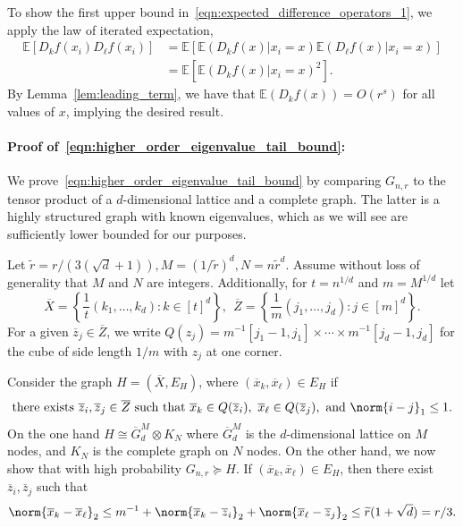 \documentclass{article}
\newcommand{\set}[1]{\left\{#1\right\}}
\newcommand{\1}{\mathbf{1}}
\newcommand{\Ebb}{\mathbb{E}}
\newcommand{\wt}[1]{\widetilde{#1}}
\newcommand{\ol}[1]{\overline{#1}}
\theoremstyle{alden}
\theoremstyle{aldenthm}
\theoremstyle{definition}
\theoremstyle{remark}
\begin{document}
To show the first upper bound in~\eqref{eqn:expected_difference_operators_1}, we apply the law of iterated expectation, 
\begin{align}
\Ebb\left[D_kf(x_i)D_{\ell}f(x_i)\right] & = \Ebb\left[\Ebb\left(D_kf(x)|x_i = x\right) \Ebb\left(D_{\ell}f(x)|x_i = x\right)\right] \nonumber \\
& = \Ebb\left[\Ebb\left(D_kf(x)|x_i = x\right)^2\right]. \label{eqn:expected_difference_operators_pf1}
\end{align}
By Lemma~\ref{lem:leading_term}, we have that $\Ebb(D_kf(x)) = O(r^s)$ for all values of $x$, implying the desired result.

\paragraph{Proof of~\eqref{eqn:higher_order_eigenvalue_tail_bound}:}

We prove~\eqref{eqn:higher_order_eigenvalue_tail_bound} by comparing $G_{n,r}$ to the tensor product of a $d$-dimensional lattice and a complete graph. The latter is a highly structured graph with known eigenvalues, which as we will see are sufficiently lower bounded for our purposes.

Let $\wt{r} = r/(3(\sqrt{d} + 1)), M = (1/\wt{r})^d, N = n\wt{r}^d$. Assume without loss of generality that $M$ and $N$ are integers. Additionally, for $t = n^{1/d}$ and $m = M^{1/d}$ let 
\begin{equation*}
\overline{X} = \set{\frac{1}{t}(k_1,\ldots,k_d): k \in [t]^d},~~ \overline{Z} = \set{\frac{1}{m}(j_1,\ldots,j_d): j \in [m]^d}.
\end{equation*}
For a given $\overline{z}_j \in \overline{Z}$, we write $Q(z_j) = m^{-1}[j_1 - 1,j_1] \times \cdots \times m^{-1}[j_d - 1,j_d]$ for the cube of side length $1/m$ with $z_j$ at one corner. 

Consider the graph $H = (\overline{X}, E_H)$, where $(\ol{x}_k, \ol{x}_{\ell}) \in E_H$ if
\begin{equation*}
\textrm{there exists}~\ol{z}_i, \ol{z}_j \in \ol{Z}~\textrm{such that}~\ol{x}_k \in Q(\ol{z}_i),~ \ol{x}_\ell \in Q(\ol{z}_j),~\textrm{and}~\norm{i - j}_1 \leq 1.
\end{equation*}
On the one hand $H \cong \ol{G}^M_d \otimes K_N$ where $\ol{G}^M_d$ is the $d$-dimensional lattice on $M$ nodes, and $K_N$ is the complete graph on $N$ nodes. On the other hand, we now show that with high probability $G_{n,r} \succeq H$. If $(\ol{x}_k, \ol{x}_{\ell}) \in E_H$, then there exist $\ol{z}_i, \ol{z}_j$ such that
\begin{equation*}
\norm{\ol{x}_k - \ol{x}_{\ell}}_2 \leq m^{-1} + \norm{\ol{x}_k - \ol{z}_{i}}_2 + \norm{\ol{x}_{\ell} - \ol{z}_{j}}_2 \leq \wt{r}(1 + \sqrt{d}) = r/3.
\end{equation*}
\end{document}
